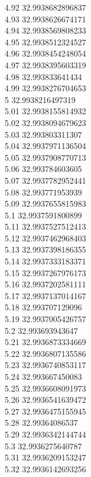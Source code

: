 {4.92	32.9938682896837\\
4.93	32.9938626674171\\
4.94	32.9938569808233\\
4.95	32.9938512324527\\
4.96	32.9938454248054\\
4.97	32.9938395603319\\
4.98	32.993833641434\\
4.99	32.9938276704653\\
5	32.9938216497319\\
5.01	32.9938155814932\\
5.02	32.9938094679623\\
5.03	32.993803311307\\
5.04	32.9937971136504\\
5.05	32.9937908770713\\
5.06	32.993784603605\\
5.07	32.9937782952441\\
5.08	32.993771953939\\
5.09	32.9937655815983\\
5.1	32.9937591800899\\
5.11	32.9937527512413\\
5.12	32.9937462968403\\
5.13	32.9937398186355\\
5.14	32.9937333183371\\
5.15	32.9937267976173\\
5.16	32.9937202581111\\
5.17	32.9937137014167\\
5.18	32.993707129096\\
5.19	32.9937005426757\\
5.2	32.993693943647\\
5.21	32.9936873334669\\
5.22	32.9936807135586\\
5.23	32.9936740853117\\
5.24	32.993667450083\\
5.25	32.9936608091973\\
5.26	32.9936541639472\\
5.27	32.9936475155945\\
5.28	32.99364086537\\
5.29	32.9936342144744\\
5.3	32.9936275640787\\
5.31	32.9936209153247\\
5.32	32.9936142693256\\
}
